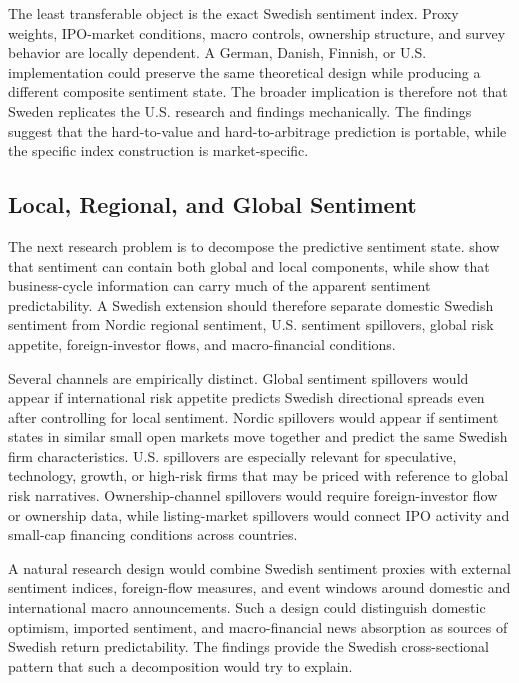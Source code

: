 \documentclass[11pt]{article}
\begin{document}
The least transferable object is the exact Swedish sentiment index. Proxy weights, IPO-market conditions, macro controls, ownership structure, and survey behavior are locally dependent. A German, Danish, Finnish, or U.S. implementation could preserve the same theoretical design while producing a different composite sentiment state. The broader implication is therefore not that Sweden replicates the U.S. research and findings mechanically. The findings suggest that the hard-to-value and hard-to-arbitrage prediction is portable, while the specific index construction is market-specific.

\subsection{Local, Regional, and Global Sentiment}
The next research problem is to decompose the predictive sentiment state. \citet{baker2012global} show that sentiment can contain both global and local components, while \citet{sibley2012sentimental} show that business-cycle information can carry much of the apparent sentiment predictability. A Swedish extension should therefore separate domestic Swedish sentiment from Nordic regional sentiment, U.S. sentiment spillovers, global risk appetite, foreign-investor flows, and macro-financial conditions.

Several channels are empirically distinct. Global sentiment spillovers would appear if international risk appetite predicts Swedish directional spreads even after controlling for local sentiment. Nordic spillovers would appear if sentiment states in similar small open markets move together and predict the same Swedish firm characteristics. U.S. spillovers are especially relevant for speculative, technology, growth, or high-risk firms that may be priced with reference to global risk narratives. Ownership-channel spillovers would require foreign-investor flow or ownership data, while listing-market spillovers would connect IPO activity and small-cap financing conditions across countries.

A natural research design would combine Swedish sentiment proxies with external sentiment indices, foreign-flow measures, and event windows around domestic and international macro announcements. Such a design could distinguish domestic optimism, imported sentiment, and macro-financial news absorption as sources of Swedish return predictability. The findings provide the Swedish cross-sectional pattern that such a decomposition would try to explain.
\end{document}
